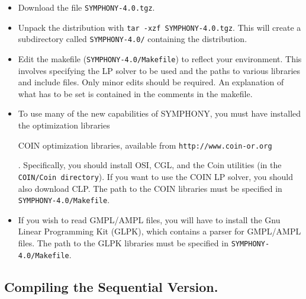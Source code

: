 \begin{itemize}

        \item Download the file {\tt SYMPHONY-4.0.tgz}.

        \item Unpack the distribution with {\tt tar -xzf
        SYMPHONY-4.0.tgz}. This will create a subdirectory called
        {\tt SYMPHONY-4.0/} containing the distribution.
        
        \item Edit the makefile ({\tt SYMPHONY-4.0/Makefile}) to reflect your
              environment. This involves specifying the LP solver to be used
              and the paths to various libraries and include files. Only minor
              edits should be required. An explanation of what has to be set
              is contained in the comments in the makefile. 

        \item To use many of the new capabilities of SYMPHONY, you must have
	      installed the
	      optimization libraries \begin{latexonly} COIN optimization
	      libraries, available from \texttt{http://www.coin-or.org}
	      \end{latexonly}.  Specifically, you should install OSI, CGL, and
	      the Coin utilities (in the \texttt{COIN/Coin directory}). If you
	      want to use the COIN LP solver, you should also download CLP.
	      The path to the COIN libraries must be specified in
	      \texttt{SYMPHONY-4.0/Makefile}.

        \item If you wish to read GMPL/AMPL files, you will have to install
	      the Gnu Linear Programming Kit (GLPK), which contains a parser
	      for GMPL/AMPL files. The path to the GLPK libraries must be
	      specified in \texttt{SYMPHONY-4.0/Makefile}.

\end{itemize}
        
\subsection{Compiling the Sequential Version.}

